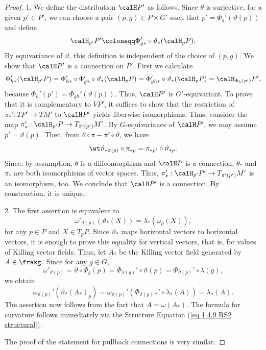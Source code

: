 \begin{proof}
    1. We define the distribution $\calH P'$ as follows. Since $\theta$ is surjective, for a given $p'\in P'$, we can choose a pair $(p,g)\in P\times G'$ such that $p'=\Phi_g'(\vartheta(p))$ and define
    \[\calH_{p'}P'\coloneqq \Phi_{g\ast}'\circ \vartheta_\ast (\calH_{p}P).\]
    By equivariance of $\vartheta$, this definition is independent of the choice of $(p,g)$. We show that $\calH P'$ is a connection on $P'$. First we calculate
    \[\Phi_{h\ast}'(\calH_{p'}P)=\Phi_{h\ast}'\circ \Phi_{g\ast}'\circ\vartheta_\ast(\calH_p P)=\Phi_{gh\ast}'\circ\vartheta_\ast(\calH_pP)=\calH_{\Phi_h(p')}P',\]
    because $\Phi_h'(p')=\Phi_{gh}'(\vartheta(p))$. Thus, $\calH P'$ is $G'$-equivariant. To prove that it is complementary to $VP'$, it suffices to show that the restriction of $\pi_\ast':TP'\to TM'$ to $\calH P'$ yields fiberwise isomorphisms. Thus, consider the map $\pi_\ast':\calH_{p'}P\to T_{\pi'(p')}M'$. By $G$-equivariance of $\calH P'$, we may assume $p'=\vartheta(p)$. Then, from $\theta\circ\pi-\pi'\circ\vartheta$, we have
    \[\wt\vartheta_{\ast\pi(p)}\circ \pi_{\ast p}=\pi_{\ast p'}\circ\vartheta_{\ast p}.\]
    Since, by assumption, $\theta$ is a diffeomorphism and $\calH P$ is a connection, $\theta_\ast$ and $\pi_\ast$ are both isomorphisms of vector spaces. Thus, $\pi_\ast':\calH_{p'}P'\to T_{\pi'(p')}M'$ is an isomorphism, too. We conclude that $\calH P'$ is a connection. By construction, it is unique.

    2. The first assertion is equivalent to
    \[\omega'_{\vartheta(p)}(\vartheta_\ast(X))=\lambda_\ast(\omega_p(X)),\]
    for any $p\in P$ and $X\in T_pP$. Since $\vartheta_\ast$ maps horizontal vectors to horizontal vectors, it is enough to prove this equality for vertical vectors, that is, for values of Killing vector fields. Thus, let $A_\ast$ be the Killing vector field generated by $A\in\frakg$. Since for any $g\in G$,
    \[\omega'_{\vartheta(p)}=\vartheta\circ \Phi_g(p)=\Phi_{\lambda(g)}'\circ\vartheta(p)=\Phi_{\vartheta(p)}'\circ\lambda(g),\]
    we obtain
    \[\omega_{\vartheta(p)}'\left(\vartheta_\ast(A_\ast)_p\right)=\omega_{\vartheta(p)}'\left(\Phi_{\vartheta(p)\ast}'\circ \lambda_\ast(A)\right)=\lambda_\ast(A).\]
    The assertion now follows from the fact that $A=\omega(A_\ast)$. The formula for curvature follows immediately via the Structure Equation (\ref{eq 1.4.9 RS2 structural}).

    The proof of the statement for pullback connections is very similar.
\end{proof}

